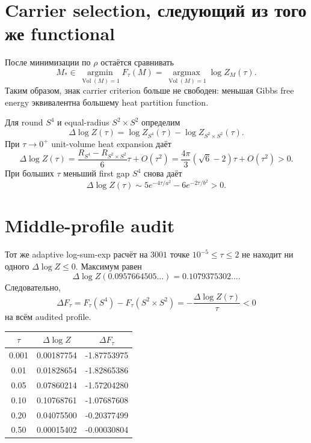 \section{Carrier selection, следующий из того же functional}

После минимизации по \(\rho\) остаётся сравнивать
\begin{equation}
 M_*\in\operatorname*{argmin}_{\operatorname{Vol}(M)=1}F_\tau(M)
 =\operatorname*{argmax}_{\operatorname{Vol}(M)=1}\log Z_M(\tau).
 \label{eq:gibbs-carrier-selection}
\end{equation}
Таким образом, знак carrier criterion больше не свободен: меньшая Gibbs free
energy эквивалентна большему heat partition function.

Для round \(S^4\) и equal-radius \(S^2\times S^2\) определим
\begin{equation}
 \Delta\log Z(\tau)
 =\log Z_{S^4}(\tau)-\log Z_{S^2\times S^2}(\tau).
\end{equation}
При \(\tau\to0^+\) unit-volume heat expansion даёт
\begin{equation}
 \Delta\log Z(\tau)
 =\frac{R_{S^4}-R_{S^2\times S^2}}6\tau+O(\tau^2)
 =\frac{4\pi}{3}(\sqrt6-2)\tau+O(\tau^2)>0.
 \label{eq:gibbs-small-tau-sign}
\end{equation}
При больших \(\tau\) меньший first gap \(S^4\) снова даёт
\begin{equation}
 \Delta\log Z(\tau)
 \sim5e^{-4\tau/a^2}-6e^{-2\tau/b^2}>0.
\end{equation}

\section{Middle-profile audit}

Тот же adaptive log-sum-exp расчёт на \(3001\) точке
\(10^{-5}\le\tau\le2\) не находит ни одного
\(\Delta\log Z\le0\). Максимум равен
\begin{equation}
 \Delta\log Z(0.0957664505\ldots)
 =0.1079375302\ldots.
\end{equation}
Следовательно,
\begin{equation}
 \Delta F_\tau
 =F_\tau(S^4)-F_\tau(S^2\times S^2)
 =-\frac{\Delta\log Z(\tau)}\tau<0
\end{equation}
на всём audited profile.

\begin{center}
\begin{tabular}{ccc}
\toprule
\(\tau\) & \(\Delta\log Z\) & \(\Delta F_\tau\) \\
\midrule
0.001 & 0.00187754 & -1.87753975 \\
0.01 & 0.01828654 & -1.82865386 \\
0.05 & 0.07860214 & -1.57204280 \\
0.10 & 0.10768761 & -1.07687608 \\
0.20 & 0.04075500 & -0.20377499 \\
0.50 & 0.00015402 & -0.00030804 \\
\bottomrule
\end{tabular}
\end{center}

